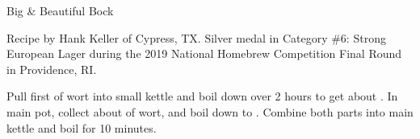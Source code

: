 \stylesection{\styledopplebock}

\begin{recipe}{Big \& Beautiful Bock}

\begin{aboutblock}
Recipe by Hank Keller of Cypress, TX. Silver medal in Category \#6: Strong European
Lager during the 2019 National Homebrew Competition Final Round in Providence, RI.
\sourceaha
\end{aboutblock}


\begin{methodandtiming}
 
\begin{mashsteps}
\end{mashsteps}

\begin{fermentationsteps}
\end{fermentationsteps}

\begin{directions}
Pull first  of wort into small kettle and boil down over 2 hours to
get about . In main pot, collect about  of wort, and
boil down to . Combine both parts into main kettle and boil
for 10 minutes.
\end{directions}

\end{methodandtiming}

\recipebreak

\begin{ingredientsblock}

\begin{malts}
\end{malts}

\begin{hops}
\end{hops}


\end{ingredientsblock}

\end{recipe}

